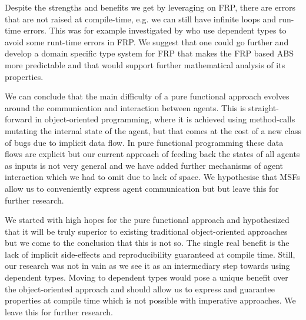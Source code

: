 Despite the strengths and benefits we get by leveraging on FRP, there are errors that are not raised at compile-time, e.g. we can still have infinite loops and run-time errors. This was for example investigated by \cite{sculthorpe_safe_2009} who use dependent types to avoid some runt-time errors in FRP. We suggest that one could go further and develop a domain specific type system for FRP that makes the FRP based ABS more predictable and that would support further mathematical analysis of its properties.

We can conclude that the main difficulty of a pure functional approach evolves around the communication and interaction between agents. This is straight-forward in object-oriented programming, where it is achieved using method-calls mutating the internal state of the agent, but that comes at the cost of a new class of bugs due to implicit data flow. In pure functional programming these data flows are explicit but our current approach of feeding back the states of all agents as inputs is not very general and we have added further mechanisms of agent interaction which we had to omit due to lack of space. We hypothesise that MSFs allow us to conveniently express agent communication but but leave this for further research.

We started with high hopes for the pure functional approach and hypothesized that it will be truly superior to existing traditional object-oriented approaches but we come to the conclusion that this is not so. The single real benefit is the lack of implicit side-effects and reproducibility guaranteed at compile time. Still, our research was not in vain as we see it as an intermediary step towards using dependent types. Moving to dependent types would pose a unique benefit over the object-oriented approach and should allow us to express and guarantee properties at compile time which is not possible with imperative approaches. We leave this for further research.